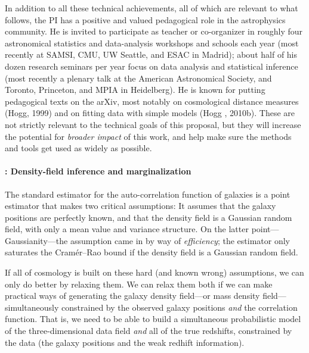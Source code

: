 \documentclass[12pt]{article}
\begin{document}
In addition to all these technical achievements, all of which are
relevant to what follows, the PI has a positive and valued pedagogical
role in the astrophysics community.
He is invited to participate as teacher or co-organizer in roughly
four astronomical statistics and data-analysis workshops and schools
each year (most recently at SAMSI, CMU, UW Seattle, and ESAC in
Madrid); about half of his dozen research seminars per year focus on
data analysis and statistical inference (most recently a plenary talk
at the American Astronomical Society, and Toronto, Princeton, and MPIA
in Heidelberg).
He is known for putting pedagogical texts on the arXiv, most notably
on cosmological distance measures (Hogg, 1999) and on fitting data
with simple models (Hogg \etal, 2010b).
These are not strictly relevant to the technical goals of this proposal,
but they will increase the potential for \emph{broader impact} of this work, and
help make sure the methods and tools get used as widely as possible.

\paragraph{: Density-field inference and marginalization}

The standard estimator for the auto-correlation function of galaxies
is a point estimator that makes two critical assumptions:
It assumes that the galaxy positions are perfectly known, and that the
density field is a Gaussian random field, with only a mean value and
variance structure.
On the latter point---Gaussianity---the assumption came in by way of
\emph{efficiency}; the estimator only saturates the Cram\'er--Rao
bound if the density field is a Gaussian random field.

If all of cosmology is built on these hard (and known wrong)
assumptions, we can only do better by relaxing them.
We can relax them both if we can make practical ways of generating the
galaxy density field---or mass density field---simultaneously
constrained by the observed galaxy positions \emph{and} the
correlation function.
That is, we need to be able to build a simultaneous probabilistic
model of the three-dimensional data field \emph{and} all of the true
redshifts, constrained by the data (the galaxy positions and the weak
redhift information).
\end{document}
